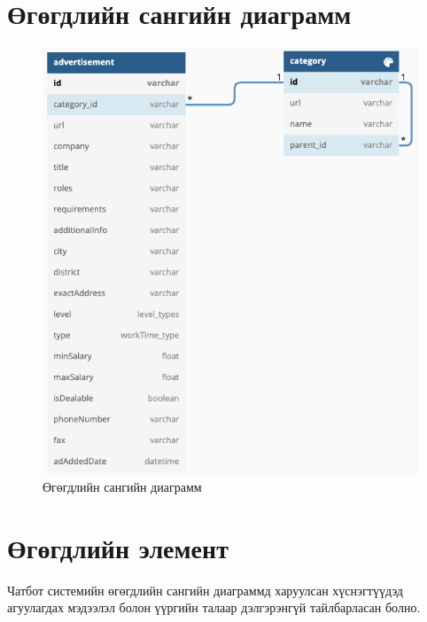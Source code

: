 \section{Өгөгдлийн сангийн диаграмм}
\begin{figure}[ht]
  \centering
  \includegraphics[width = \textwidth-2.5cm]{images/dbDiagram.png}
  \caption{Өгөгдлийн сангийн диаграмм}\label{fig:dbDiagram}
\end{figure}
\newpage

\section{Өгөгдлийн элемент}
Чатбот системийн өгөгдлийн сангийн диаграммд харуулсан хүснэгтүүдэд агуулагдах мэдээлэл болон үүргийн талаар дэлгэрэнгүй тайлбарласан болно. 
